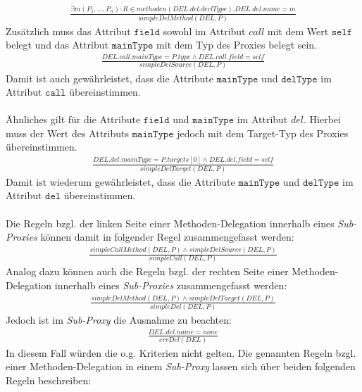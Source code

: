 \documentclass[a4paper,12pt]{article}
\begin{document}
\begin{gather*}
\frac{\exists m(P_1,...,P_n):R \in \mathit{methoden(DEL.del.declType)}. \mathit{DEL.del.name} = m}
{\mathit{simpleDelMethod(DEL, P)}}
\end{gather*}
Zusätzlich muss das Attribut $\texttt{field}$ sowohl im Attribut $call$ mit dem Wert $\texttt{self}$ belegt und das Attribut $\texttt{mainType}$ mit dem Typ des Proxies belegt sein.
\begin{gather*}
\frac{\mathit{DEL.call.mainType} = \mathit{P.type} \wedge \mathit{DEL.call.field} = \mathit{self}}
{\mathit{simpleDelSource(DEL, P)}}
\end{gather*}
Damit ist auch gewährleistet, dass die Attribute $\texttt{mainType}$ und $\texttt{delType}$ im Attribut $\texttt{call}$ übereinstimmen.\\\\
Ähnliches gilt für die Attribute $\texttt{field}$ und $\texttt{mainType}$ im Attribut $del$. Hierbei muss der Wert des Attributs $\texttt{mainType}$ jedoch mit dem Target-Typ des Proxies übereinstimmen.
\begin{gather*}
\frac{\mathit{DEL.del.mainType} = \mathit{P.targets[0]}\wedge \mathit{DEL.del.field} = \mathit{self}}
{\mathit{simpleDelTarget(DEL, P)}}
\end{gather*}
Damit ist wiederum gewährleistet, dass die Attribute $\texttt{mainType}$ und $\texttt{delType}$ im Attribut $\texttt{del}$ übereinstimmen.\\\\
Die Regeln bzgl. der linken Seite einer Methoden-Delegation innerhalb eines \emph{Sub-Proxies} können damit in folgender Regel zusammengefasst werden:
\begin{gather*}
\frac{\mathit{simpleCallMethod(DEL,P)} \wedge \mathit{simpleDelSource(DEL,P)}}
{simpleCall(DEL,P)}
\end{gather*}
Analog dazu können auch die Regeln bzgl. der rechten Seite einer Methoden-Delegation innerhalb eines \emph{Sub-Proxies} zusammengefasst werden:
\begin{gather*}
\frac{\mathit{simpleDelMethod(DEL,P)} \wedge \mathit{simpleDelTarget(DEL,P)}}
{simpleDel(DEL,P)}
\end{gather*}
Jedoch ist im \emph{Sub-Proxy} die Ausnahme zu beachten:
\begin{gather*}
\frac{\mathit{DEL.del.name} = \mathit{none}}
{\mathit{errDel(DEL)}}
\end{gather*}
In diesem Fall würden die o.g. Kriterien nicht gelten. Die genannten Regeln bzgl. einer Methoden-Delegation in einem \emph{Sub-Proxy} lassen sich über beiden folgenden Regeln beschreiben:
\end{document}
